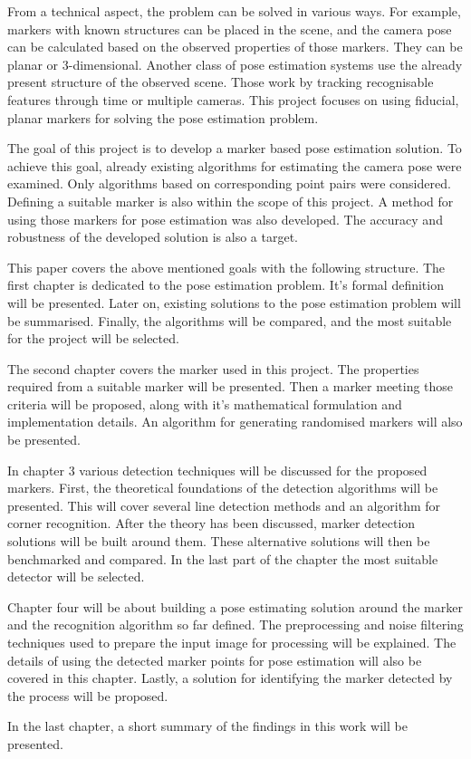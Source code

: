 From a technical aspect, the problem can be solved in various ways.
For example, markers with known structures can be placed in the scene, and the camera pose can be calculated based on the observed properties of those markers.
They can be planar or 3-dimensional.
Another class of pose estimation systems use the already present structure of the observed scene.
Those work by tracking recognisable features through time or multiple cameras.
This project focuses on using fiducial, planar markers for solving the pose estimation problem.

The goal of this project is to develop a marker based pose estimation solution.
To achieve this goal, already existing algorithms for estimating the camera pose were examined.
Only algorithms based on corresponding point pairs were considered.
Defining a suitable marker is also within the scope of this project.
A method for using those markers for pose estimation was also developed.
The accuracy and robustness of the developed solution is also a target.

This paper covers the above mentioned goals with the following structure.
The first chapter is dedicated to the pose estimation problem.
It's formal definition will be presented.
Later on, existing solutions to the pose estimation problem will be summarised.
Finally, the algorithms will be compared, and the most suitable for the project will be selected.

The second chapter covers the marker used in this project.
The properties required from a suitable marker will be presented.
Then a marker meeting those criteria will be proposed, along with it's mathematical formulation and implementation details.
An algorithm for generating randomised markers will also be presented. 

In chapter 3 various detection techniques will be discussed for the proposed markers.
First, the theoretical foundations of the detection algorithms will be presented.
This will cover several line detection methods and an algorithm for corner recognition.
After the theory has been discussed, marker detection solutions will be built around them.
These alternative solutions will then be benchmarked and compared.
In the last part of the chapter the most suitable detector will be selected.

Chapter four will be about building a pose estimating solution around the marker and the recognition algorithm so far defined.
The preprocessing and noise filtering techniques used to prepare the input image for processing will be explained.
The details of using the detected marker points for pose estimation will also be covered in this chapter.
Lastly, a solution for identifying the marker detected by the process will be proposed.

In the last chapter, a short summary of the findings in this work will be presented.
